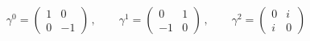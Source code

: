 \begin{equation}
\gamma^0=\left( \begin{array}{cc}
1&0\\
0&-1 \end{array}\right)\,,\qquad
\gamma^1=\left( \begin{array}{cc}
0&1\\
-1&0 \end{array}\right)\,,\qquad
\gamma^2=\left( \begin{array}{cc}
0&i\\
i&0 \end{array}\right) \label{gamma}
\end{equation}

